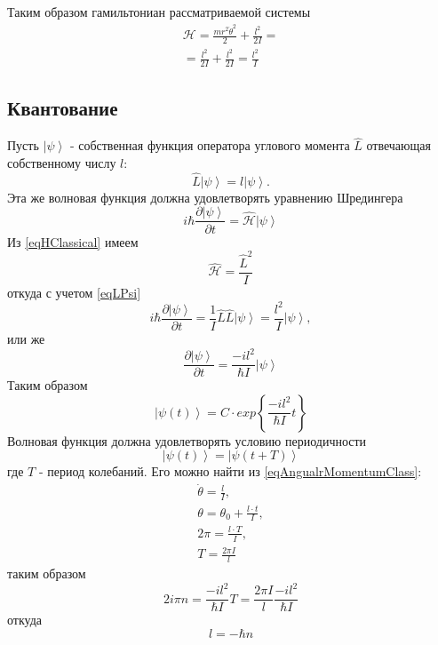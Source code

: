 Таким образом гамильтониан  рассматриваемой системы
\begin{eqnarray}
\mathcal{H} = \frac{m r^2 \dot{\theta}^2 }{2} + \frac{l^2}{2 I} = 
\nonumber \\
= \frac{l^2}{2 I} + \frac{l^2}{2 I} = \frac{l^2}{I}
\label{eqHClassical}
\end{eqnarray}

\subsection{Квантование}

Пусть $\left|\psi\right>$ - собственная функция оператора углового
момента $\hat{L}$ отвечающая собственному числу $l$:
\begin{equation}
\hat{L} \left|\psi\right> = l \left|\psi\right>.
\label{eqLPsi}
\end{equation}
Эта же волновая функция должна удовлетворять уравнению Шредингера
\[
i \hbar \frac{\partial \left|\psi\right>}{ \partial t} = 
\hat { \mathcal{H} } \left|\psi\right>
\]
Из \eqref{eqHClassical} имеем
\[
\hat { \mathcal{H} } = \frac{\hat{L}^2}{I}
\]
откуда с учетом \eqref{eqLPsi}
\[
i \hbar \frac{\partial \left|\psi\right>}{ \partial t} = 
\frac{1}{I} \hat{L} \hat{L} \left|\psi\right> = 
\frac{l^2}{I} \left|\psi\right>,
\]
или же
\[
\frac{\partial \left|\psi\right>}{ \partial t} = 
\frac{-i l^2}{\hbar I} \left|\psi\right>
\]
Таким образом
\[
\left|\psi\left(t \right)\right> = C \cdot exp\left\{\frac{-i l^2}{\hbar
    I} t
\right\}
\]
Волновая функция должна удовлетворять условию периодичности
\[
\left|\psi\left(t \right) \right>= \left|\psi\left(t + T \right)\right>
\]
где $T$ - период колебаний. Его можно найти из
\eqref{eqAngualrMomentumClass}:
\begin{eqnarray}
\dot{\theta} = \frac{l}{I},
\nonumber \\
\theta = \theta_0 + \frac{l \cdot t}{I},
\nonumber \\
2 \pi = \frac{l \cdot T}{I},
\nonumber \\
T = \frac{2 \pi I}{l}
\nonumber 
\end{eqnarray}
таким образом
\[
2 i \pi n = \frac{-i l^2}{\hbar I} T = 
\frac{2 \pi I}{l} \frac{-i l^2}{\hbar I}
\]
откуда
\[
l = -\hbar n
\]
